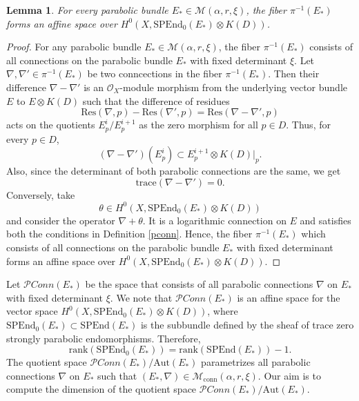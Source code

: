 \documentclass[11pt, reqno]{amsart}
\numberwithin{equation}{section}
\newtheorem{lemma}[theorem]{Lemma}
\theoremstyle{definition}
\begin{document}
	\begin{lemma}
		For every parabolic bundle $E_* \in \mathcal{M}(\alpha, r, \xi)$, the fiber $\pi^{-1}(E_*)$ forms an affine space over $H^0(X,\mathrm{SPEnd}_0(E_*)\otimes K(D))$.
	\end{lemma}
	\begin{proof}
		For any parabolic bundle $E_* \in \mathcal{M}(\alpha, r, \xi)$, the fiber $\pi^{-1}(E_*)$ consists of all connections on the parabolic bundle $E_*$ with fixed determinant $\xi$. Let $\nabla, \nabla' \in \pi^{-1}(E_*)$ be two conncections in the fiber $\pi^{-1}(E_*)$. Then their difference $\nabla - \nabla'$ is an $\mathcal{O}_X$-module morphism from the underlying vector bundle $E$ to $E\otimes K(D)$ such that the difference of residues
		\[
		\mathrm{Res}(\nabla,p) -\mathrm{Res}(\nabla',p) = \mathrm{Res}(\nabla-\nabla',p)
		\]
		acts on the quotients $E_p^i/E_p^{i+1}$ as the zero morphism for all $p\in D$. Thus, for every $p \in D$,
		\[
		(\nabla -\nabla')(E_p^i)\subset E_p^{i+1} \otimes \left.K(D)\right|_p.
		\]
		Also, since the determinant of both parabolic connections are the same, we get
		\[
		\mathrm{trace}(\nabla - \nabla') = 0.
		\]
  Conversely, take
  \[
  \theta \in H^0(X, \mathrm{SPEnd}_0(E_*)\otimes K(D))
  \]
  and consider the operator $\nabla + \theta$. It is a logarithmic connection on $E$ and satisfies both the conditions in Definition \ref{pconn}. Hence, the fiber $\pi^{-1}(E_*)$ which consists of all connections on the parabolic bundle $E_*$ with fixed determinant forms an affine space over $H^0(X,\mathrm{SPEnd}_0(E_*)\otimes K(D))$.
	\end{proof}

 		Let $\mathcal{P}\textit{Conn}(E_*)$ be the space that consists of all parabolic connections $\nabla$ on $E_*$ with fixed determinant $\xi$. We note that $\mathcal{P}\textit{Conn}(E_*)$ is an affine space for the vector space $H^0(X, \mathrm{SPEnd}_0(E_*) \otimes K(D))$, where $\mathrm{SPEnd}_0(E_*) \subset \mathrm{SPEnd}(E_*)$ is the subbundle defined by the sheaf of trace zero strongly parabolic endomorphisms. Therefore,
  \[
  \mathrm{rank} (\mathrm{SPEnd}_0(E_*)) = \mathrm{rank}(\mathrm{SPEnd}(E_*)) - 1.
  \]
  The quotient space $\mathcal{P}\textit{Conn}(E_*)/\mathrm{Aut}(E_*)$ parametrizes all  parabolic connections $\nabla$ on $E_*$ such that $(E_*,\nabla) \in \mathcal{M}_{\mathrm{conn}}(\alpha, r, \xi)$. 
  Our aim is to compute the dimension of the quotient space $\mathcal{P}\textit{Conn}(E_*)/\mathrm{Aut}(E_*)$. 
	
\end{document}
